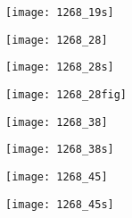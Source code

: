 \texttt{[image: 1268\_19s]}

\texttt{[image: 1268\_28]}

\texttt{[image: 1268\_28s]}

\begin{center}
\texttt{[image: 1268\_28fig]}
\end{center}

\texttt{[image: 1268\_38]}

\texttt{[image: 1268\_38s]}

\texttt{[image: 1268\_45]}

\texttt{[image: 1268\_45s]}




%



